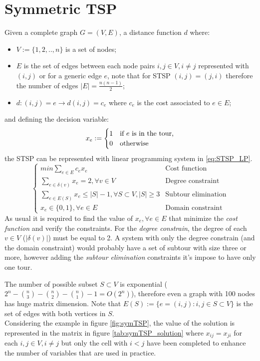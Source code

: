 \section{Symmetric TSP}
Given a complete graph $ G = (V, E) $, a distance function $ d $ where:
\begin{itemize}
	\item $ V := \{1, 2, .., n\}$ is a set of nodes;
	\item $ E $ is the set of edges between each node pairs $ i,j \in V, i \ne j $ represented with $ (i,j) $ or for a generic edge $ e $, note that for STSP $ (i,j) = (j,i) $ therefore the number of edges $ |E| = \frac{n(n-1)}{2} $;
	\item $ d: (i,j) = e \to d(i,j) = c_e $ where $ c_e $ is the cost associated to $ e \in E $;
\end{itemize}
and defining the decision variable:
\[
x_e := \begin{cases}
	1 & \text{if $ e $ is in the tour,} \\
	0 & \text{otherwise}
\end{cases}
\] 
the STSP can be represented with linear programming system in \ref{eq:STSP_LP}. 
\begin{equation}
\begin{cases}
		min \sum_{ e\in E } c_ex_e & \text{Cost function} \\
		\sum_{e\in \delta (v) } x_e = 2, \forall v \in V  & \text{Degree constraint} \\
		\sum_{e\in E(S) } x_e \le |S|-1, \forall S \subset V, |S| \ge 3  & \text{Subtour elimination} \\
		x_e \in \{0,1\}, \forall e \in E & \text{Domain constraint}
\end{cases}
\label{eq:STSP_LP}
\end{equation} 
As usual it is required to find the value of $ x_e, \forall e \in E $ that minimize the \textit{cost function} and verify the constraints.
For the \textit{degree constrain}, the degree of each $ v \in V $ ($ |\delta(v)| $) must be equal to 2. A system with only the degree constrain (and the domain constraint) would probably have a set of subtour with size three or more, however adding the \textit{subtour elimination} constraints  it's impose to have only one tour. 

The number of possible subset $ S \subset V $ is exponential ($ 2^{n} - \binom{n}{3} -\binom{n}{2} -\binom{n}{1} - 1 = O(2^n)$), therefore even a graph with 100 nodes has huge matrix dimension. Note that $ E(S) := \{ e = (i,j): i,j \in S \subset V \}$ is the set of edges with both vertices in $ S $.\\
Considering the example in figure \ref{fig:symTSP}, the value of the solution is represented in the matrix in figure \ref{tab:symTSP_solution} where $ x_{ij} = x_{ji} $ for each $ i,j \in V, i \ne j $ but only the cell with $ i < j $ have been completed to enhance the number of variables that are used in practice.

